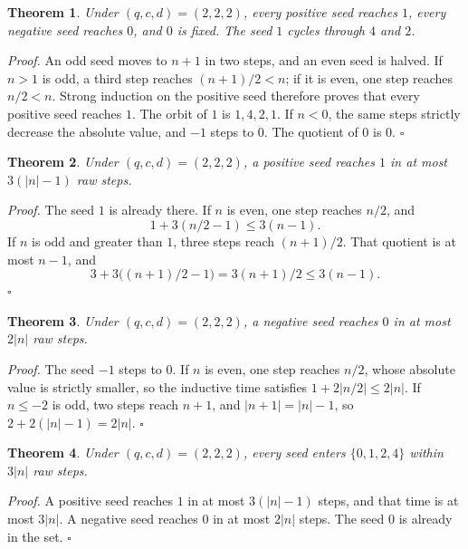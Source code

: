 \documentclass[11pt,letterpaper]{article}
\newtheorem{theorem}{Theorem}
\newenvironment{proof}{\noindent\textit{Proof.}}{\hfill\(\square\)}
\begin{document}
\begin{theorem}
\label{thm:sharedorbit}
Under \((q,c,d)=(2,2,2)\), every positive seed reaches \(1\), every negative seed reaches \(0\), and \(0\) is fixed. The seed \(1\) cycles through \(4\) and \(2\).
\end{theorem}

\begin{proof}
An odd seed moves to \(n+1\) in two steps, and an even seed is halved. If \(n>1\) is odd, a third step reaches \((n+1)/2<n\); if it is even, one step reaches \(n/2<n\). Strong induction on the positive seed therefore proves that every positive seed reaches \(1\). The orbit of \(1\) is \(1,4,2,1\). If \(n<0\), the same steps strictly decrease the absolute value, and \(-1\) steps to \(0\). The quotient of \(0\) is \(0\).
\end{proof}

\begin{theorem}
\label{thm:sharedtime}
Under \((q,c,d)=(2,2,2)\), a positive seed reaches \(1\) in at most \(3(|n|-1)\) raw steps.
\end{theorem}

\begin{proof}
The seed \(1\) is already there. If \(n\) is even, one step reaches \(n/2\), and
\[
1+3(n/2-1)\le 3(n-1).
\]
If \(n\) is odd and greater than \(1\), three steps reach \((n+1)/2\). That quotient is at most \(n-1\), and
\[
3+3\bigl((n+1)/2-1\bigr)=3(n+1)/2\le 3(n-1).
\]
\end{proof}

\begin{theorem}
\label{thm:sharednegtime}
Under \((q,c,d)=(2,2,2)\), a negative seed reaches \(0\) in at most \(2|n|\) raw steps.
\end{theorem}

\begin{proof}
The seed \(-1\) steps to \(0\). If \(n\) is even, one step reaches \(n/2\), whose absolute value is strictly smaller, so the inductive time satisfies \(1+2|n/2|\le 2|n|\). If \(n\le -2\) is odd, two steps reach \(n+1\), and \(|n+1|=|n|-1\), so \(2+2(|n|-1)=2|n|\).
\end{proof}

\begin{theorem}
\label{thm:sharedentry}
Under \((q,c,d)=(2,2,2)\), every seed enters \(\{0,1,2,4\}\) within \(3|n|\) raw steps.
\end{theorem}

\begin{proof}
A positive seed reaches \(1\) in at most \(3(|n|-1)\) steps, and that time is at most \(3|n|\). A negative seed reaches \(0\) in at most \(2|n|\) steps. The seed \(0\) is already in the set.
\end{proof}
\end{document}
